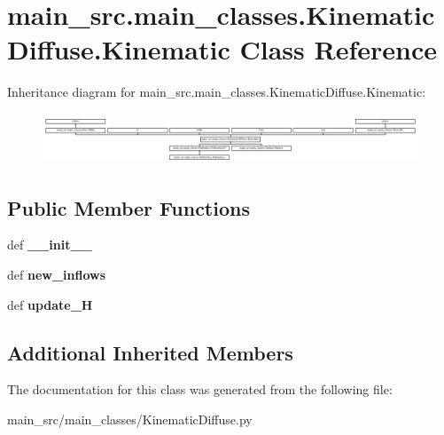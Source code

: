 \hypertarget{classmain__src_1_1main__classes_1_1KinematicDiffuse_1_1Kinematic}{\section{main\-\_\-src.\-main\-\_\-classes.\-Kinematic\-Diffuse.\-Kinematic Class Reference}
\label{classmain__src_1_1main__classes_1_1KinematicDiffuse_1_1Kinematic}
}
Inheritance diagram for main\-\_\-src.\-main\-\_\-classes.\-Kinematic\-Diffuse.\-Kinematic\-:\begin{figure}[H]
\begin{center}
\leavevmode
\includegraphics[height=1.525054cm]{classmain__src_1_1main__classes_1_1KinematicDiffuse_1_1Kinematic}
\end{center}
\end{figure}
\subsection*{Public Member Functions}
\begin{DoxyCompactItemize}
\item 
\hypertarget{classmain__src_1_1main__classes_1_1KinematicDiffuse_1_1Kinematic_a61d5d072d970070519cadea2d06e2d75}{def {\bfseries \-\_\-\-\_\-init\-\_\-\-\_\-}}\label{classmain__src_1_1main__classes_1_1KinematicDiffuse_1_1Kinematic_a61d5d072d970070519cadea2d06e2d75}

\item 
\hypertarget{classmain__src_1_1main__classes_1_1KinematicDiffuse_1_1Kinematic_a6ab07d78ae3ff80266ac6fb28559fd8b}{def {\bfseries new\-\_\-inflows}}\label{classmain__src_1_1main__classes_1_1KinematicDiffuse_1_1Kinematic_a6ab07d78ae3ff80266ac6fb28559fd8b}

\item 
\hypertarget{classmain__src_1_1main__classes_1_1KinematicDiffuse_1_1Kinematic_ab2a31204c228675e568880ad5454af23}{def {\bfseries update\-\_\-\-H}}\label{classmain__src_1_1main__classes_1_1KinematicDiffuse_1_1Kinematic_ab2a31204c228675e568880ad5454af23}

\end{DoxyCompactItemize}
\subsection*{Additional Inherited Members}


The documentation for this class was generated from the following file\-:\begin{DoxyCompactItemize}
\item 
main\-\_\-src/main\-\_\-classes/Kinematic\-Diffuse.\-py\end{DoxyCompactItemize}
